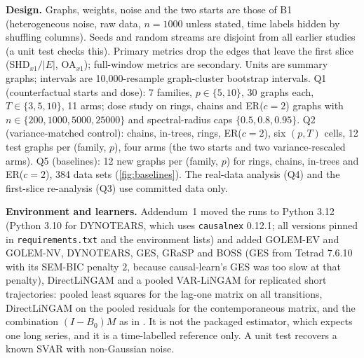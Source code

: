 \textbf{Design.} Graphs, weights, noise and the two starts are those of B1
(heterogeneous noise, raw data, $n=1000$ unless stated, time labels hidden by
shuffling columns). Seeds and random streams are disjoint from all earlier
studies (a unit test checks this). Primary metrics drop the edges that leave the
first slice (SHD$_{x1}/|E|$, OA$_{x1}$); full-window metrics are secondary.
Units are summary graphs; intervals are 10{,}000-resample graph-cluster
bootstrap intervals. Q1 (counterfactual starts and dose): 7 families, $p\in\{5,10\}$,
30 graphs each, $T\in\{3,5,10\}$, 11 arms; dose study on rings, chains and
ER($c{=}2$) graphs with $n\in\{200,1000,5000,25000\}$ and spectral-radius caps
$\{0.5,0.8,0.95\}$. Q2 (variance-matched control): chains, in-trees, rings,
ER($c{=}2$), six $(p,T)$ cells, 12 test graphs per (family, $p$), four arms (the
two starts and two variance-rescaled arms). Q5 (baselines): 12 new graphs per
(family, $p$) for rings, chains, in-trees and ER($c{=}2$), 384 data sets (\cref{fig:baselines}). The
real-data analysis (Q4) and the first-slice re-analysis (Q3) use committed data
only.

\textbf{Environment and learners.} Addendum~1 moved the runs to Python 3.12
(Python 3.10 for DYNOTEARS, which uses \texttt{causalnex} 0.12.1; all versions
pinned in \texttt{requirements.txt} and the environment lists) and added
GOLEM-EV and GOLEM-NV, DYNOTEARS, GES, GRaSP and BOSS (GES from Tetrad 7.6.10
with its SEM-BIC penalty $2$, because causal-learn's GES was too slow at that
penalty), DirectLiNGAM and a pooled VAR-LiNGAM for replicated short
trajectories: pooled least squares for the lag-one matrix on all transitions,
DirectLiNGAM on the pooled residuals for the contemporaneous matrix, and the
combination $(I-B_0)M$ as in \citet{hyvarinen2010varlingam}. It is not the
packaged estimator, which expects one long series, and it is a time-labelled
reference only. A unit test recovers a known SVAR with non-Gaussian noise.

